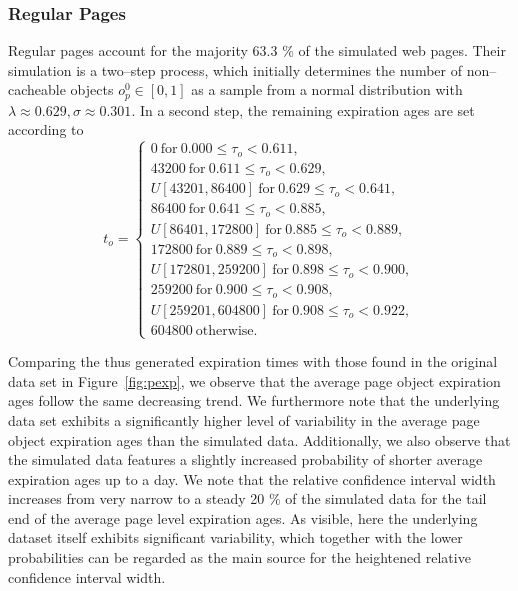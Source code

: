 \documentclass[letterpaper,conference]{IEEEtran}
\begin{document}
\subsubsection{Regular Pages}
Regular pages account for the majority 63.3 \% of the simulated web pages. 
Their simulation is a two--step process, which initially determines the number of non--cacheable objects $o^0_p \in [0,1]$ as a sample from a normal distribution with $\lambda \approx 0.629, \sigma \approx 0.301$.
In a second step, the remaining expiration ages are set according to 
\begin{equation}\label{eq:t2}
t_o =
\begin{cases}
	0	~\mathrm{for}~	0.000	\le \tau_o <	0.611,                \\
	43200	~\mathrm{for}~	0.611	\le \tau_o <	0.629,            \\
	U[43201,86400]	~\mathrm{for}~	0.629	\le \tau_o <	0.641,   \\
	86400	~\mathrm{for}~	0.641	\le \tau_o <	0.885,            \\
	U[86401,172800]	~\mathrm{for}~	0.885	\le \tau_o <	0.889,  \\
	172800	~\mathrm{for}~	0.889	\le \tau_o <	0.898,           \\
	U[172801,259200]	~\mathrm{for}~	0.898	\le\tau_o <	0.900, \\
	259200	~\mathrm{for}~	0.900	\le \tau_o <	0.908,          \\
	U[259201,604800]	~\mathrm{for}~	0.908	\le \tau_o <	0.922, \\
	604800	~\mathrm{otherwise}.
\end{cases}
\end{equation}

Comparing the thus generated expiration times with those found in the original data set in Figure~\ref{fig:pexp}, we observe that the average page object expiration ages follow the same decreasing trend.
We furthermore note that the underlying data set exhibits a significantly higher level of variability in the average page object expiration ages than the simulated data. 
Additionally, we also observe that the simulated data features a slightly increased probability of shorter average expiration ages up to a day.
We note that the relative confidence interval width increases from very narrow to a steady 20 \% of the simulated data 
for the tail end of the average page level expiration ages. 
As visible, here the underlying dataset itself exhibits significant variability, which together with the lower probabilities can be regarded as the main source for the heightened relative confidence interval width.
\end{document}

